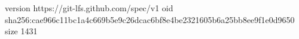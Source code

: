 version https://git-lfs.github.com/spec/v1
oid sha256:cae966c11bc1a4c669b5e9c26dcac6bf8e4be2321605b6a25bb8ee9f1e0d9650
size 1431
